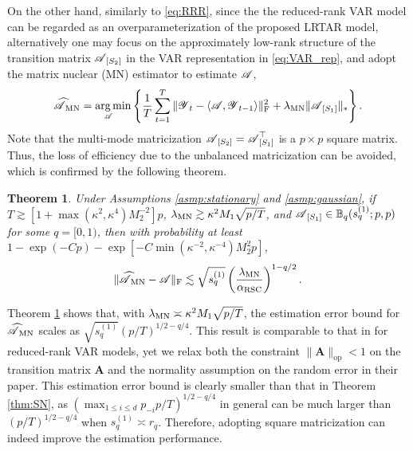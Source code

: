 \documentclass[12pt]{article}
\newtheorem{theorem}{Theorem}
\DeclareMathOperator*{\argmin}{arg\,min}
\newcommand{\bm}{\boldsymbol}
\newcommand{\cm}[1]{\mbox{\boldmath$\mathscr{#1}$}}
\begin{document}
On the other hand, similarly to \eqref{eq:RRR}, since the the reduced-rank VAR  model can be regarded as an overparameterization of the proposed LRTAR model, alternatively one may focus on the approximately low-rank structure of the transition matrix $\cm{A}_{[S_2]}$ in the VAR representation in \eqref{eq:VAR_rep}, and adopt the matrix nuclear (MN)  estimator \citep{negahban2011estimation} to estimate $\cm{A}$,
\begin{equation}\label{eq:matrixnuclear}
\cm{\widehat{A}}_{\text{MN}}=\underset{\scalebox{0.7}{\cm{A}}}{\argmin}\left\{\frac{1}{T}\sum_{t=1}^T\|\cm{Y}_t-\langle\cm{A},\cm{Y}_{t-1}\rangle\|_\text{F}^2+\lambda_{\textup{MN}}\|\cm{A}_{[S_1]}\|_*\right\}.
\end{equation}
Note that the multi-mode matricization $\cm{A}_{[S_2]}=\cm{A}_{[S_1]}^\top$ is a $p\times p$ square matrix. Thus, the loss of efficiency due to the unbalanced matricization can be avoided, which is confirmed by the following theorem.

\begin{theorem}\label{thm:MN}
Under Assumptions \ref{asmp:stationary} and \ref{asmp:gaussian}, if $T\gtrsim [1+\max(\kappa^2,\kappa^4)M_2^{-2}]p$, $\lambda_{\textup{MN}}\gtrsim\kappa^2M_1\sqrt{p/T}$, and $\cm{A}_{[S_1]}\in\mathbb{B}_q(s_q^{(1)};p,p)$ for some $q=[0,1)$, then with probability at least $1-\exp(-Cp)-\exp[-C\min(\kappa^{-2},\kappa^{-4})M_2^2p]$,
	\begin{equation*}
	\|\cm{\widehat{A}}_{\textup{MN}}-\cm{A}\|_{\textup{F}}\lesssim\sqrt{s_q^{(1)}}\left(\frac{\lambda_{\textup{MN}}}{\alpha_{\textup{RSC}}}\right)^{1-q/2}.
	\end{equation*}
\end{theorem}

Theorem \ref{thm:MN} shows that, with  $\lambda_{\textup{MN}}\asymp\kappa^2M_1\sqrt{p/T}$, the estimation error bound for $\cm{\widehat{A}}_{\text{MN}}$ scales as $\sqrt{s_q^{(1)}}(p/T)^{1/2-q/4}$. This result is comparable to that in \citet{negahban2011estimation} for reduced-rank VAR models, yet we relax both the constraint $\|\bm{A}\|_{\text{op}}<1$ on the transition matrix $\bm{A}$ and the normality assumption on the random error in their paper. This estimation error bound is clearly smaller than that in Theorem \ref{thm:SN}, as $(\max_{1\leq i\leq d}p_{-i}p/T)^{1/2-q/4}$ in general can be much larger than $(p/T)^{1/2-q/4}$ when $s_q^{(1)}\asymp r_q$. Therefore, adopting square matricization can indeed improve the estimation performance. 
\end{document}
